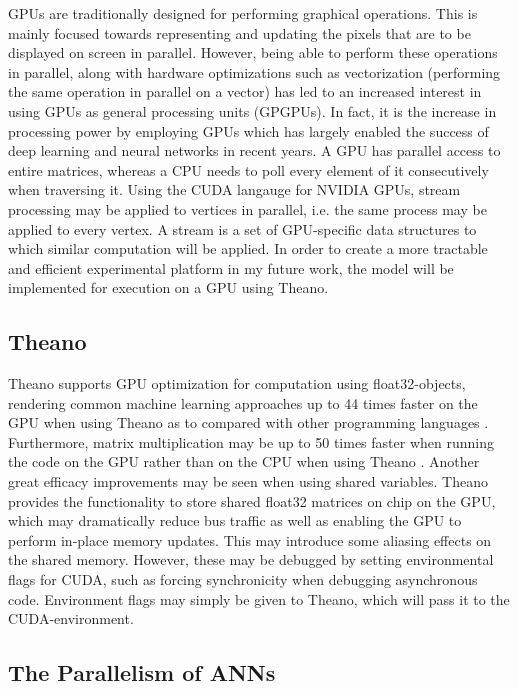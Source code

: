 GPUs are traditionally designed for performing graphical operations. This is mainly focused towards representing and updating the pixels that are to be displayed on screen in parallel. However, being able to perform these operations in parallel, along with hardware optimizations such as vectorization (performing the same operation in parallel on a vector) has led to an increased interest in using GPUs as general processing units (GPGPUs). In fact, it is the increase in processing power by employing GPUs which has largely enabled the success of deep learning and neural networks in recent years.
A GPU has parallel access to entire matrices, whereas a CPU needs to poll every element of it consecutively when traversing it. Using the CUDA langauge for NVIDIA GPUs, stream processing may be applied to vertices in parallel, i.e. the same process may be applied to every vertex. A stream is a set of GPU-specific data structures to which similar computation will be applied.
In order to create a more tractable and efficient experimental platform in my future work, the model will be implemented for execution on a GPU using Theano.

\subsection{Theano}

Theano supports GPU optimization for computation using float32-objects, rendering common machine learning approaches up to 44 times faster on the GPU when using Theano as to compared with other programming languages \citep{Bergstra2010}. Furthermore, matrix multiplication may be up to 50 times faster when running the code on the GPU rather than on the CPU when using Theano \citep{LISA-lab2015c}. Another great efficacy improvements may be seen when using shared variables. Theano provides the functionality to store shared float32 matrices on chip on the GPU, which may dramatically reduce bus traffic as well as enabling the GPU to perform in-place memory updates. This may introduce some aliasing effects on the shared memory. However, these may be debugged by setting environmental flags for CUDA, such as forcing synchronicity when debugging asynchronous code. Environment flags may simply be given to Theano, which will pass it to the CUDA-environment.

\subsection{The Parallelism of ANNs}

